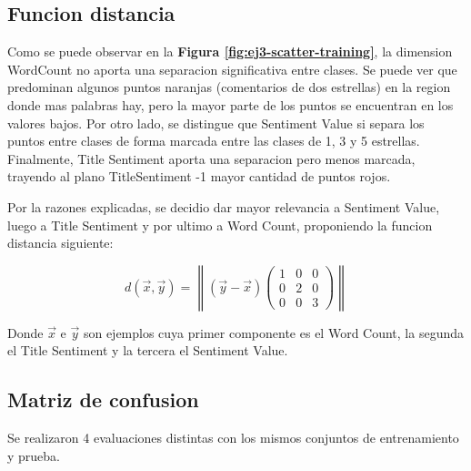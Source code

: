 \documentclass[a4paper]{article}
\newcommand{\reffig}[1]{\textbf{Figura \ref{#1}}}
\begin{document}
\subsection{Funcion distancia}
Como se puede observar en la \reffig{fig:ej3-scatter-training}, la dimension WordCount no aporta una separacion significativa entre clases. Se puede ver que predominan algunos puntos naranjas (comentarios de dos estrellas) en la region donde mas palabras hay, pero la mayor parte de los puntos se encuentran en los valores bajos. Por otro lado, se distingue que Sentiment Value si separa los puntos entre clases de forma marcada entre las clases de 1, 3 y 5 estrellas. Finalmente, Title Sentiment aporta una separacion pero menos marcada, trayendo al plano TitleSentiment -1 mayor cantidad de puntos rojos.

Por la razones explicadas, se decidio dar mayor relevancia a Sentiment Value, luego a Title Sentiment y por ultimo a Word Count, proponiendo la funcion distancia siguiente:

\begin{equation}
  d(\vec{x},\vec{y}) = \left \|(\vec{y}-\vec{x})\begin{pmatrix}
    1 & 0 & 0\\ 
    0 & 2 & 0\\ 
    0 & 0 & 3
    \end{pmatrix}\right \|
\end{equation}

Donde $\vec{x}$ e $\vec{y}$ son ejemplos cuya primer componente es el Word Count, la segunda el Title Sentiment y la tercera el Sentiment Value.

\subsection{Matriz de confusion}

Se realizaron 4 evaluaciones distintas con los mismos conjuntos de entrenamiento y prueba.
\end{document}

